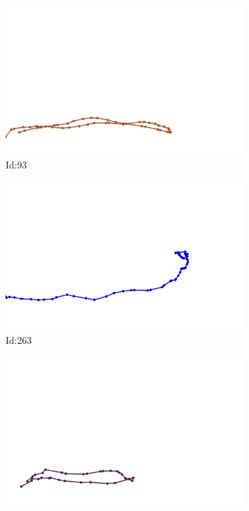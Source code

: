 \documentclass[12pt,twoside]{report}
\begin{document}
\begin{figure}
\centering
\begin{subfigure}[b]{0.20\textwidth}
\centering
\includegraphics[width=\textwidth]{../trajectories/93.png}
\caption{Id:93}
\end{subfigure}
\begin{subfigure}[b]{0.20\textwidth}
\centering
\includegraphics[width=\textwidth]{../trajectories/263.png}
\caption{Id:263}
\end{subfigure}
\begin{subfigure}[b]{0.20\textwidth}
\centering
\includegraphics[width=\textwidth]{../trajectories/302.png}

\end{subfigure}
\end{figure}
\end{document}
